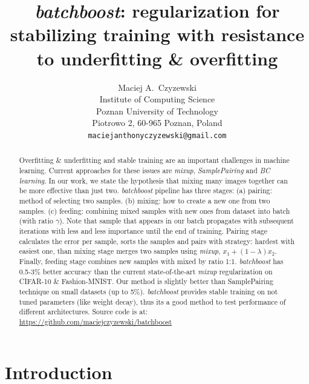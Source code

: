 \documentclass{article}
\title{\emph{batchboost}: regularization for stabilizing training with
	resistance to underfitting \& overfitting}
\author{
  Maciej A.~Czyzewski\\
  Institute of Computing Science\\
  Poznan University of Technology\\
  Piotrowo 2, 60-965 Poznan, Poland\\
  \texttt{maciejanthonyczyzewski@gmail.com} \\
}
\begin{document}
\maketitle


\begin{abstract}
	Overfitting \& underfitting and stable training are an important challenges in
	machine learning.
	Current approaches for these issues are \emph{mixup}\cite{zhang2017mixup},
	\emph{SamplePairing}\cite{inoue2018data}
	and \emph{BC learning}\cite{tokozume2018between}.
	In our work, we state the hypothesis that mixing many images together can be more
	effective than just two.
	\emph{batchboost} pipeline has three stages:
	(a) pairing: method of selecting two samples.
	(b) mixing: how to create a new one from two samples.
	(c) feeding: combining mixed samples with new ones from dataset into batch (with ratio $\gamma$).
	Note that sample that appears in our batch propagates with
	subsequent iterations with less and less importance until the end of training.
	Pairing stage calculates the error per sample, sorts the samples and pairs
	with strategy: hardest with easiest one, than mixing stage merges two samples
	using \emph{mixup}, $x_1 + (1-\lambda)x_2$. Finally, feeding stage combines
	new samples with mixed by ratio 1:1. 
	\emph{batchboost} has 0.5-3\% better accuracy than the current
	state-of-the-art \emph{mixup} regularization on
	CIFAR-10\cite{krizhevsky2009learning} \&
	Fashion-MNIST\cite{xiao2017}.
	Our method is slightly better than SamplePairing technique
	on small datasets (up to 5\%).
	\emph{batchboost} provides stable training on not tuned parameters (like weight
	decay), thus its a good method to test performance of different architectures.
	Source code is at: \url{https://github.com/maciejczyzewski/batchboost}
\end{abstract}


\section{Introduction}
\label{sec:introduction}
\end{document}
